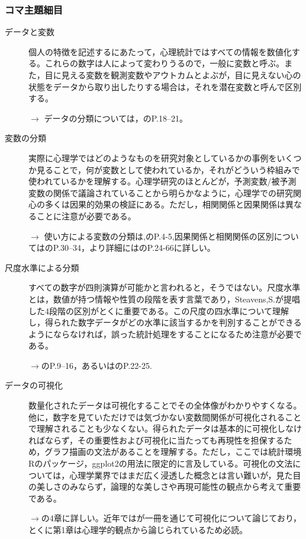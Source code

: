 \subsubsection{コマ主題細目}
\begin{description}
	\item[データと変数] 個人の特徴を記述するにあたって，心理統計ではすべての情報を数値化する。これらの数字は人によって変わりうるので，一般に変数と呼ぶ。また，目に見える変数を観測変数やアウトカムとよぶが，目に見えない心の状態をデータから取り出したりする場合は，それを潜在変数と呼んで区別する。
	      \begin{flushright}
		      $\to$ データの分類については，\citet{Yamada2004}のP.18--21。
	      \end{flushright}

	\item[変数の分類] 実際に心理学ではどのようなものを研究対象としているかの事例をいくつか見ることで，何が変数として使われているか，それがどういう枠組みで使われているかを理解する。心理学研究のほとんどが，予測変数/被予測変数の関係で議論されていることから明らかなように，心理学での研究関心の多くは因果的効果の検証にある。ただし，相関関係と因果関係は異なることに注意が必要である。
	      \begin{flushright}
		      $\to$ 使い方による変数の分類は,\citet{Yamauchi201001}のP.4-5,因果関係と相関関係の区別については\citet{Miura201705}のP.30--34，より詳細には\citet{Toyoda1992}のP.24-66に詳しい。
	      \end{flushright}

	\item[尺度水準による分類] すべての数字が四則演算が可能かと言われると，そうではない。尺度水準とは，数値が持つ情報や性質の段階を表す言葉であり，Steavens,S.が提唱した4段階の区別がとくに重要である。この尺度の四水準について理解し，得られた数字データがどの水準に該当するかを判別することができるようにならなければ，誤った統計処理をすることになるため注意が必要である。
	      \begin{flushright}
		      $\to$\citet{Kawabata201408}のP.9--16，あるいは\citet{Yamada2004}のP.22-25.
	      \end{flushright}

	\item[データの可視化] 数量化されたデータは可視化することでその全体像がわかりやすくなる。他に，数字を見ていただけでは気づかない変数間関係が可視化されることで理解されることも少なくない。得られたデータは基本的に可視化しなければならず，その重要性および可視化に当たっても再現性を担保するため，グラフ描画の文法があることを理解する。ただし，ここでは統計環境Rのパッケージ，ggplot2の用法に限定的に言及している。可視化の文法については，心理学業界ではまだ広く浸透した概念とは言い難いが，見た目の美しさのみならず，論理的な美しさや再現可能性の観点から考えて重要である。
	      \begin{flushright}
		      $\to$\citet{Kinosady2021}の4章に詳しい。近年では\citet{Kieran2018}が一冊を通じて可視化について論じており，とくに第1章は心理学的観点から論じられているため必読。
	      \end{flushright}


\end{description}
